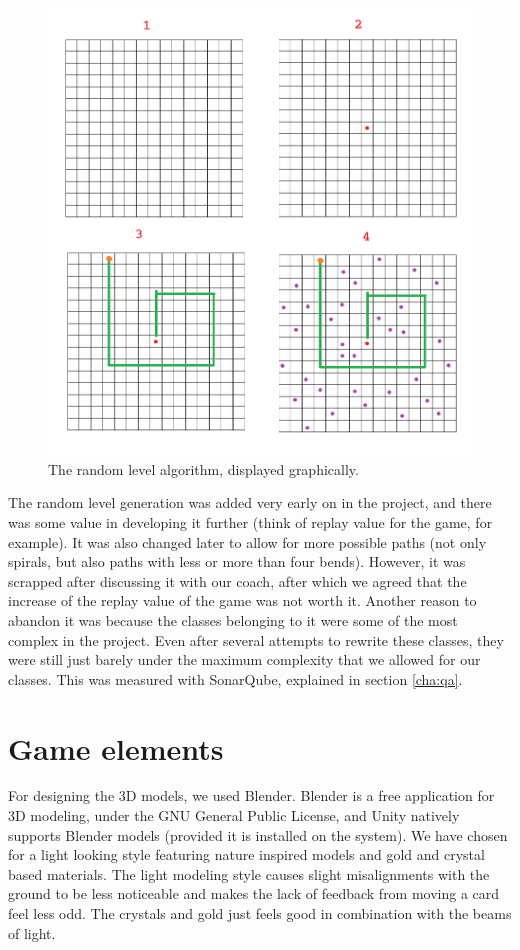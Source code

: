 			\begin{figure}[ht]
				\centering
				\includegraphics[scale = 0.4]{RandomLevelAlgorithm}
				\caption{The random level algorithm, displayed graphically.}
				\label{fig:random}
			\end{figure}
			
			The random level generation was added very early on in the project,
			and there was some value in developing it further (think of replay
			value for the game, for example). It was also changed later to
			allow for more possible paths (not only spirals, but also paths with
			less or more than four bends). However, it was scrapped after
			discussing it with our coach, after which we agreed that the increase 
			of the replay value of the game was not worth it. Another reason to abandon 
			it was because the classes belonging to it were some of the most complex
			in the project. Even after several attempts to rewrite these classes, 
			they were still just barely under the maximum complexity that we
			allowed for our classes. This was measured with SonarQube, explained
			in section \ref{cha:qa}.
			
	\section{Game elements} \label{sec:graphicaldesign}
		For designing the 3D models, we used Blender. Blender is a free 
		application for 3D modeling, under the GNU General Public License, and 
		Unity natively supports Blender models (provided it is installed on
		the system). We have chosen for a light looking style featuring nature 
		inspired models and gold and crystal based materials. The light modeling
		style causes slight misalignments with the ground to be less noticeable 
		and makes the lack of feedback from moving a card feel less odd. The 
		crystals and gold just feels good in combination with the beams of light.
		

